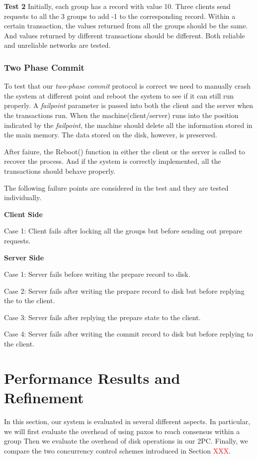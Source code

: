 \documentclass{vldb}
\begin{document}
\textbf{Test 2} Initially, each group has a record with value 10.  
Three clients send requests to all the 3 groups to add -1 to the 
corresponding record. Within a certain transaction, the values 
returned from all the groups should be the same. And values returned 
by different transactions should be different. Both reliable and 
unreliable networks are tested.

\subsubsection{Two Phase Commit}

To test that our \textit{two-phase commit} protocol is correct we need 
to manually crash the system at different point and reboot the system 
to see if it can still run properly. A \textit{failpoint} parameter is 
passed into both the client and the server when the transactions run.  
When the machine(client/server) runs into the position indicated by 
the \textit{failpoint}, the machine should delete all the information 
stored in the main memory. The data stored on the disk, however, is 
preserved.

After faiure, the Reboot() function in either the client or the server 
is called to recover the process. And if the system is correctly 
implemented, all the transactions should behave properly.

The following failure points are considered in the test and they are 
tested individually.

\textbf{Client Side}

Case 1: Client fails after locking all the groups but before sending 
out prepare requests.

\textbf{Server Side}

Case 1: Server fails before writing the prepare record to disk.

Case 2: Server fails after writing the prepare record to disk but 
before replying the to the client.

Case 3: Server fails after replying the prepare state to the client.

Case 4: Server fails after writing the commit record to disk but 
before replying to the client.


\section{Performance Results and Refinement}

In this section, our system is evaluated in several different aspects.  
In particular, we will first evaluate the overhead of using paxos to 
reach consensus within a group Then we evaluate the overhead of disk 
operations in our 2PC. Finally, we compare the two concurrency control 
schemes introduced in Section \textcolor{red}{XXX}.
\end{document}

